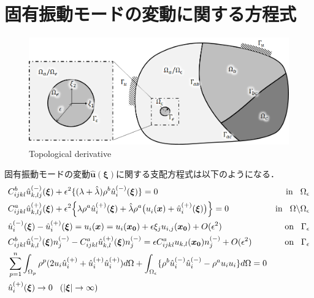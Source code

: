 \section{固有振動モードの変動に関する方程式}

\begin{figure}[ht]
	\begin{center}
		\includegraphics[width=13cm]{./figures/TD.png}
		\caption{Topological derivative}
		\label{fig:TD}
	\end{center}
\end{figure}

固有振動モードの変動$\hat{\bm{u}}(\bm{\xi})$に関する支配方程式は以下のようになる．
\begin{align}
&C_{ijkl}^{b} \hat{u}^{(-)}_{k,lj}(\bm{\xi})
+\epsilon^2\{(\lambda+\hat{\lambda})\rho^{b} \hat{u}_{i}^{(-)}(\bm{\xi})\}=0&\text{in}\hspace{0.3cm}\Omega_{\epsilon}
\label{eq:GovDisturIn}
\\
&C_{ijkl}^{a}\hat{u}^{(+)}_{k,lj}(\bm{\xi})
+\epsilon^2\Bigl \{\lambda\rho^{a} \hat{u}_{i}^{(+)}(\bm{\xi})
+\hat{\lambda}\rho^{a} \bigl(u_{i}^{}(\bm{x})+\hat{u}_{i}^{(+)}(\bm{\xi}) \bigr) \Bigr \}=0
&\text{in}\hspace{0.3cm}\Omega\backslash\Omega_{\epsilon}
\label{eq:GovDisturOut}
\\
&\hat{u}_{i}^{(-)}(\bm{\xi})-\hat{u}_{i}^{(+)}(\bm{\xi})=u_{i}(\bm{x})=u_{i}(\bm{x_0})+\epsilon \xi_j u_{i,j}(\bm{x_0})+O(\epsilon^2) &\text{on}\hspace{0.3cm}\Gamma_{\epsilon}
\label{eq:GovDisturUBC}
\\
&C_{ijkl}^{b}\hat{u}_{k,l}^{(-)}(\bm{\xi})n_{j}^{(-)}
-C_{ijkl}^{a}\hat{u}_{k,l}^{(+)}(\bm{\xi})n_{j}^{(-)}
=\epsilon C_{ijkl}^{a}u_{k,l}(\bm{x_0})n_{j}^{(-)}+O(\epsilon^2) &\text{on}\hspace{0.3cm}\Gamma_{\epsilon}
\label{eq:GovDisturSBC}
\\
&\sum_{p=1}^{n}\int_{\Omega_p}\rho^{p}(2u_{i}\hat{u}_{i}^{(+)}+\hat{u}_{i}^{(+)}\hat{u}_{i}^{(+)}) d\Omega
+\int_{\Omega_{\epsilon}}\{\rho^{b}\hat{u}_{i}^{(-)}\hat{u}_{i}^{(-)}-\rho^{a}u_{i}u_{i}\} d\Omega=0
\label{eq:GovDisturNorm}
\\
&\hat{u}_{i}^{(+)}(\bm{\xi})\rightarrow 0 \hspace{0.3cm} (|\bm{\xi}|\rightarrow \infty)
\label{eq:GovDisturInftyBC}
\end{align}

